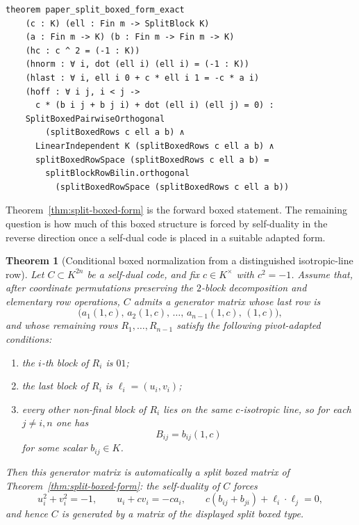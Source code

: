 \documentclass[12pt]{article}
\newtheorem{theorem}{Theorem}[section]
\begin{document}
\begin{lstlisting}[caption={Lean for Theorem~\ref{thm:split-boxed-form}.}]
theorem paper_split_boxed_form_exact
    (c : K) (ell : Fin m -> SplitBlock K)
    (a : Fin m -> K) (b : Fin m -> Fin m -> K)
    (hc : c ^ 2 = (-1 : K))
    (hnorm : ∀ i, dot (ell i) (ell i) = (-1 : K))
    (hlast : ∀ i, ell i 0 + c * ell i 1 = -c * a i)
    (hoff : ∀ i j, i < j ->
      c * (b i j + b j i) + dot (ell i) (ell j) = 0) :
    SplitBoxedPairwiseOrthogonal
        (splitBoxedRows c ell a b) ∧
      LinearIndependent K (splitBoxedRows c ell a b) ∧
      splitBoxedRowSpace (splitBoxedRows c ell a b) =
        splitBlockRowBilin.orthogonal
          (splitBoxedRowSpace (splitBoxedRows c ell a b))
\end{lstlisting}

\medskip

Theorem~\ref{thm:split-boxed-form} is the forward boxed statement. The remaining question is how much of this boxed structure is forced by self-duality in the reverse direction once a self-dual code is placed in a suitable adapted form.

\begin{theorem}[Conditional boxed normalization from a distinguished isotropic-line row]
\label{thm:conditional-split-boxed-normalization}
Let \(C\subset K^{2n}\) be a self-dual code, and fix \(c\in K^\times\) with \(c^2=-1\). Assume that, after coordinate permutations preserving the \(2\)-block decomposition and elementary row operations, \(C\) admits a generator matrix whose last row is
\[
\bigl(a_1(1,c),\,a_2(1,c),\,\dots,\,a_{n-1}(1,c),\,(1,c)\bigr),
\]
and whose remaining rows \(R_1,\dots,R_{n-1}\) satisfy the following pivot-adapted conditions:
\begin{enumerate}
\item the \(i\)-th block of \(R_i\) is \(01\);
\item the last block of \(R_i\) is \(\ell_i=(u_i,v_i)\);
\item every other non-final block of \(R_i\) lies on the same \(c\)-isotropic line, so for each \(j\neq i,n\) one has
\[
B_{ij}=b_{ij}(1,c)
\]
for some scalar \(b_{ij}\in K\).
\end{enumerate}
Then this generator matrix is automatically a split boxed matrix of Theorem~\ref{thm:split-boxed-form}: the self-duality of \(C\) forces
\[
u_i^2+v_i^2=-1,
\qquad
u_i+c v_i=-c a_i,
\qquad
c(b_{ij}+b_{ji})+\ell_i\cdot \ell_j=0,
\]
and hence \(C\) is generated by a matrix of the displayed split boxed type.
\end{theorem}
\end{document}
